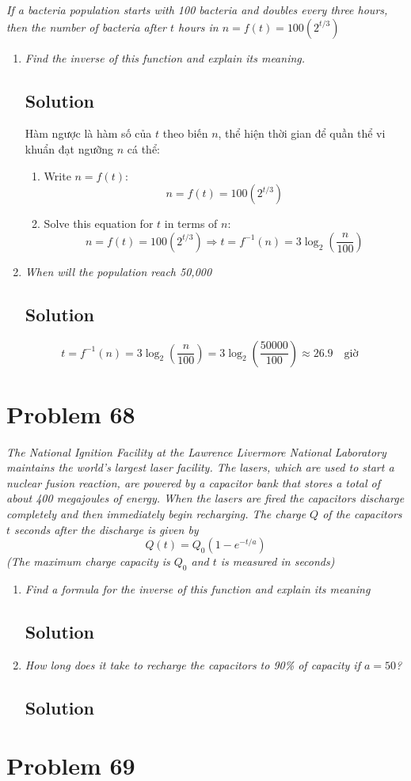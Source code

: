 \documentclass[11pt]{article}
\newcommand{\soln}{\subsection*}
\newcommand{\qn}{\textit}
\newcommand{\eqtext}[1]{\quad\text{#1}\quad}
\begin{document}
\qn{If a bacteria population starts with 100 bacteria and doubles every three hours, then the number of bacteria after $t$ hours in $n=f(t)=100(2^{t/3})$}
\begin{enumerate}
	\item \qn{Find the inverse of this function and explain its meaning.}
	\soln{Solution}
	Hàm ngược là hàm số của $t$ theo biến $n$, thể hiện thời gian để quần thể vi khuẩn đạt ngưỡng $n$ cá thể:
	\begin{enumerate}
		\item Write $n=f(t)$: $$n=f(t)=100(2^{t/3})$$
		\item Solve this equation for $t$ in terms of $n$: $$n=f(t)=100(2^{t/3}) \Rightarrow t=f^{-1}(n)=3\log_2(\frac{n}{100})$$
	\end{enumerate}
	
	\item \qn{When will the population reach 50,000}
	\soln{Solution}
	$$t=f^{-1}(n)=3\log_2(\frac{n}{100})=3\log_2(\frac{50000}{100})\approx26.9 \eqtext{giờ}$$
\end{enumerate}

\section*{Problem 68}

\qn{The National Ignition Facility at the Lawrence Livermore National Laboratory maintains the world's largest laser facility. The lasers, which are used to start a nuclear fusion reaction, are powered by a capacitor bank that stores a total of about 400 megajoules of energy. When the lasers are fired the capacitors discharge completely and then immediately begin recharging. The charge $Q$ of the capacitors $t$ seconds after the discharge is given by $$Q(t)=Q_0(1-e^{-t/a})$$ (The maximum charge capacity is $Q_0$ and $t$ is measured in seconds)}
\begin{enumerate}
	\item \qn{Find a formula for the inverse of this function and explain its meaning}
	\soln{Solution}
	
	\item \qn{How long does it take to recharge the capacitors to 90\% of capacity if $a=50$?}
	\soln{Solution}
\end{enumerate}

\section*{Problem 69}
\end{document}
